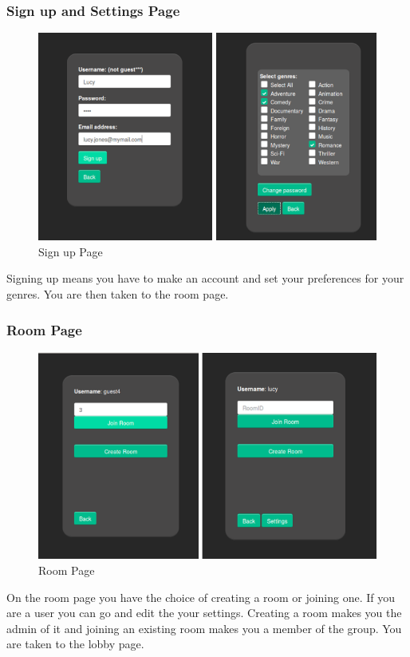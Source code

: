 \documentclass{article}
\begin{document}
\subsubsection{Sign up and Settings Page}
\begin{figure}[H]
\centering
\caption{Sign up Page}
\label{sec:sysarchitecture}
\includegraphics[scale=0.5]{signuppage}
\end{figure}
Signing up means you have to make an account and set your preferences for your genres. You are then taken to the room page.
\subsubsection{Room Page}
\begin{figure}[H]
\centering
\caption{Room Page}
\label{sec:sysarchitecture}
\includegraphics[scale=0.5]{roompage}
\end{figure}
On the room page you have the choice of creating a room or joining one. If you are a user you can go and edit the your settings. Creating a room makes you the admin of it and joining an existing room makes you a member of the group. You are taken to the lobby page. 
\end{document}
